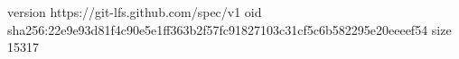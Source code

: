 version https://git-lfs.github.com/spec/v1
oid sha256:22e9e93d81f4c90e5e1ff363b2f57fc91827103c31cf5c6b582295e20eeeef54
size 15317
